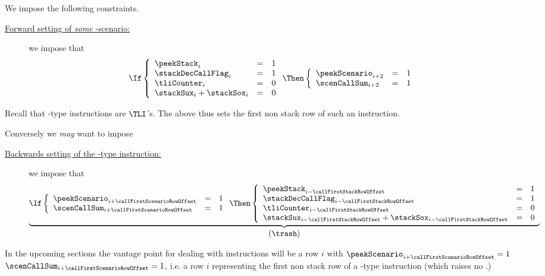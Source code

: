 We impose the following constraints.
\begin{description}
	\item[\underline{Forward setting of \emph{some} -scenario:}]
		we impose that
		\[
			\If
			\left\{ \begin{array}{lcl}
				\peekStack        _{i} & = & 1 \\
				\stackDecCallFlag _{i} & = & 1 \\
				\tliCounter       _{i} & = & 0 \\
				\stackSux         _{i} +
				\stackSox         _{i} & = & 0 \\
			\end{array} \right.
			\Then
			\left\{ \begin{array}{lcl}
				\peekScenario _{i + 2} & = & 1 \\
				\scenCallSum  _{i + 2} & = & 1 \\
			\end{array} \right.
		\]
\end{description}
\saNote{} Recall that -type instructions are $\TLI$'s. The above thus sets the first non stack row of such an instruction. 

Conversely we \emph{may} want to impose
\begin{description}
	\item[\underline{Backwards setting of the -type instruction:}]
		we impose that
		\[
			\underbrace{\If
			\left\{ \begin{array}{lcl}
				\peekScenario _{i + \callFirstScenarioRowOffset} & = & 1 \\
				\scenCallSum  _{i + \callFirstScenarioRowOffset} & = & 1 \\
			\end{array} \right.
			\Then
			\left\{ \begin{array}{lcl}
				\peekStack        _{i - \callFirstStackRowOffset} & = & 1 \\
				\stackDecCallFlag _{i - \callFirstStackRowOffset} & = & 1 \\
				\tliCounter       _{i - \callFirstStackRowOffset} & = & 0 \\
				\stackSux         _{i - \callFirstStackRowOffset} +
				\stackSox         _{i - \callFirstStackRowOffset} & = & 0 \\
			\end{array} \right.}_{\displaystyle (\trash)}
		\]
\end{description}
\saNote{}
In the upcoming sections the vantage point for dealing with  instructions will be a row $i$ with $\peekScenario _{i + \callFirstScenarioRowOffset} = 1$ \et $\scenCallSum  _{i + \callFirstScenarioRowOffset} = 1$, i.e. a row $i$ representing the first non stack row of a -type instruction (which raises no \suxSH{}.)
